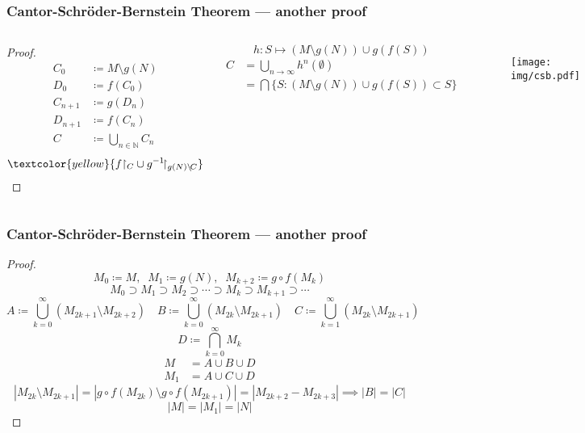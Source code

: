 \documentclass[UTF8,11pt,colorlinks,compress,openany]{beamer}%
\begin{document}
\begin{frame}\frametitle{Cantor-Schr\"oder-Bernstein Theorem --- another proof}
\setlength\abovedisplayskip{0pt}
\setlength\belowdisplayskip{0pt}
	\vspace{-2ex}
	\begin{columns}
			\begin{proof}
				\begin{align*}
				C_0&\coloneqq M\setminus g(N)\\
				D_0&\coloneqq f(C_0)\\
				C_{n+1}&\coloneqq g(D_n)\\
				D_{n+1}&\coloneqq f(C_n)\\
				C&\coloneqq \bigcup\limits_{n\in\mathbb{N}}C_n
				\end{align*}
				\[\textcolor{yellow}{f{\restriction_C}\cup g^{-1}\!{\restriction_{g(N)\setminus\!C}}}\]
			\end{proof}\vspace{-2ex}
			\[h: S\mapsto (M\setminus g(N))\cup g(f(S))\]
			\begin{align*}
			C&=\bigcup\limits_{n\to\infty}h^n(\emptyset)\\
			&=\bigcap\Big\{S: (M\setminus g(N))\cup g(f(S))\subset S\Big\}
			\end{align*}
		\begin{figure}
			\texttt{[image: img/csb.pdf]}
		\end{figure}
	\end{columns}
\end{frame}

\begin{frame}\frametitle{Cantor-Schr\"oder-Bernstein Theorem --- another proof}\vspace{-1ex}
	\begin{proof}
		\[M_0\coloneqq M,\;\;M_1\coloneqq g(N),\;\;M_{k+2}\coloneqq g\circ f(M_k)\]
		\[M_0\supset M_1\supset M_2\supset\cdots\supset M_k\supset M_{k+1}\supset\cdots\]
	\setlength\abovedisplayskip{0pt}
	\setlength\belowdisplayskip{0pt}
		\[
		A\coloneqq \bigcup\limits_{k=0}^\infty (M_{2k+1}\setminus M_{2k+2})\quad
		B\coloneqq \bigcup\limits_{k=0}^\infty (M_{2k}\setminus M_{2k+1})\quad
		C\coloneqq \bigcup\limits_{k=1}^\infty (M_{2k}\setminus M_{2k+1})\]
		\[D\coloneqq \bigcap\limits_{k=0}^\infty M_k\]
		\begin{align*}
		M&=A\cup B\cup D\\
		M_1&=A\cup C\cup D
		\end{align*}
		\[|M_{2k}\setminus M_{2k+1}|=|g\circ f(M_{2k})\setminus g\circ f(M_{2k+1})|=|M_{2k+2}-M_{2k+3}|\implies |B|=|C|\]
		\[|M|=|M_1|=|N|\]
	\end{proof}
\end{frame}
\end{document}
